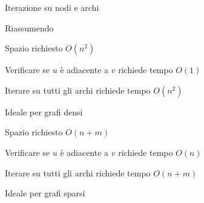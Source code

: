\begin{frame}{Iterazione su nodi e archi}

\begin{myboxtitle}
\vspace{-12pt}
\begin{Procedure}
\end{Procedure}
\vspace{-12pt}
\end{myboxtitle}    

\begin{myboxtitle}

\vspace{6pt}
\end{myboxtitle}    


\end{frame}



\begin{frame}{Riassumendo}

\begin{myboxtitle}
\BI
\item Spazio richiesto $O(n^2)$
\item Verificare se $u$ è adiacente a $v$ richiede tempo $O(1)$
\item Iterare su tutti gli archi richiede tempo $O(n^2)$
\item \alert{Ideale per grafi densi}
\EI
\end{myboxtitle}

\begin{myboxtitle}
\BI
\item Spazio richiesto $O(n+m)$
\item Verificare se $u$ è adiacente a $v$ richiede tempo $O(n)$
\item Iterare su tutti gli archi richiede tempo $O(n+m)$
\item \alert{Ideale per grafi sparsi}
\EI
\end{myboxtitle}

\end{frame}


